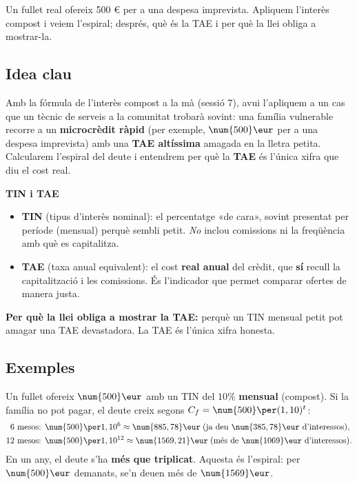 %
{Un fullet real ofereix 500 € per a una despesa imprevista. Apliquem l'interès compost i veiem l'espiral; després, què és la TAE i per què la llei obliga a mostrar-la.}

\subsection{Idea clau}

Amb la fórmula de l'interès compost a la mà (sessió 7), avui l'apliquem a un cas que
un tècnic de serveis a la comunitat trobarà sovint: una família vulnerable recorre a
un \textbf{microcrèdit ràpid} (per exemple, $\num{500}\eur$ per a una despesa
imprevista) amb una \textbf{TAE altíssima} amagada en la lletra petita. Calcularem
l'espiral del deute i entendrem per què la \textbf{TAE} és l'única xifra que diu el
cost real.

\begin{idea}
\textbf{TIN i TAE}
\begin{itemize}[leftmargin=1.4em, itemsep=2pt]
  \item \textbf{TIN} (tipus d'interès nominal): el percentatge «de cara», sovint
        presentat per període (mensual) perquè sembli petit. \emph{No} inclou
        comissions ni la freqüència amb què es capitalitza.
  \item \textbf{TAE} (taxa anual equivalent): el cost \textbf{real anual} del crèdit,
        que \textbf{sí} recull la capitalització i les comissions. És l'indicador que
        permet comparar ofertes de manera justa.
\end{itemize}
\textbf{Per què la llei obliga a mostrar la TAE:} perquè un TIN mensual petit pot
amagar una TAE devastadora. La TAE és l'única xifra honesta.
\end{idea}

\subsection{Exemples}

\begin{exemple}
Un fullet ofereix $\num{500}\eur$ amb un TIN del $10\%$ \textbf{mensual} (compost). Si
la família no pot pagar, el deute creix segons $C_f=\num{500}\per (1,10)^{t}$:
\[
\begin{aligned}
\text{6 mesos: } &\num{500}\per 1,10^{6}\approx\num{885,78}\eur \;(\text{ja deu }\num{385,78}\eur\text{ d'interessos}),\\
\text{12 mesos: } &\num{500}\per 1,10^{12}\approx\num{1569,21}\eur \;(\text{més de }\num{1069}\eur\text{ d'interessos}).
\end{aligned}
\]
En un any, el deute s'ha \textbf{més que triplicat}. Aquesta és l'espiral: per
$\num{500}\eur$ demanats, se'n deuen més de $\num{1569}\eur$.
\end{exemple}

